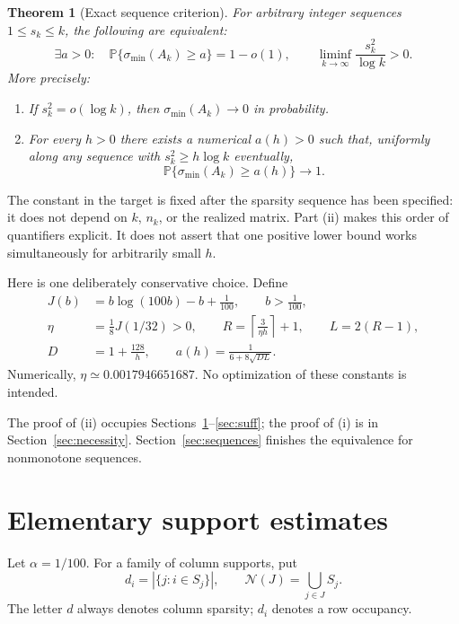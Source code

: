 \documentclass[11pt]{article}
\newtheorem{theorem}{Theorem}[section]
\theoremstyle{definition}
\theoremstyle{remark}
\newcommand{\PP}{\mathbb P}
\newcommand{\smin}{\sigma_{\min}}
\newcommand{\abs}[1]{\left\lvert #1\right\rvert}
\newcommand{\calN}{\mathcal N}
\begin{document}
\begin{theorem}[Exact sequence criterion]\label{thm:main}
For arbitrary integer sequences $1\leq s_k\leq k$, the following are equivalent:
\begin{equation}\label{eq:criterion}
 \exists a>0:\quad \PP\{\smin(A_k)\geq a\}=1-o(1),
 \qquad
 \liminf_{k\to\infty}\frac{s_k^2}{\log k}>0.
\end{equation}
More precisely:
\begin{enumerate}[label=(\roman*),nosep]
\item If $s_k^2=o(\log k)$, then $\smin(A_k)\to0$ in probability.
\item For every $h>0$ there exists a numerical $a(h)>0$ such that, uniformly along any sequence with $s_k^2\geq h\log k$ eventually,
\[
 \PP\{\smin(A_k)\geq a(h)\}\longrightarrow1.
\]
\end{enumerate}
\end{theorem}

The constant in the target is fixed after the sparsity sequence has been specified: it does not depend on $k$, $n_k$, or the realized matrix. Part (ii) makes this order of quantifiers explicit. It does not assert that one positive lower bound works simultaneously for arbitrarily small $h$.

Here is one deliberately conservative choice. Define
\begin{align}
 J(b)&=b\log(100b)-b+\frac1{100},\qquad b>\frac1{100},\label{eq:J}\\
 \eta&=\frac18 J(1/32)>0,\qquad
 R=\left\lceil\frac{3}{\eta h}\right\rceil+1,\qquad L=2(R-1),\label{eq:constants}\\
 D&=1+\frac{128}{h},\qquad
 a(h)=\frac1{6+8\sqrt{DL}}.\label{eq:a}
\end{align}
Numerically, $\eta\simeq0.0017946651687$. No optimization of these constants is intended.

The proof of (ii) occupies Sections~\ref{sec:support}--\ref{sec:suff}; the proof of (i) is in Section~\ref{sec:necessity}. Section~\ref{sec:sequences} finishes the equivalence for nonmonotone sequences.

\section{Elementary support estimates}\label{sec:support}

Let $\alpha=1/100$. For a family of column supports, put
\[
 d_i=\abs{\{j:i\in S_j\}},
 \qquad
 \calN(J)=\bigcup_{j\in J}S_j.
\]
The letter $d$ always denotes column sparsity; $d_i$ denotes a row occupancy.
\end{document}
